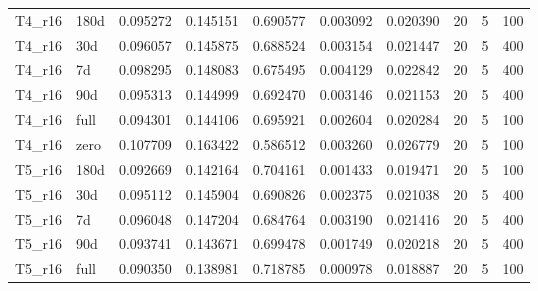 \begin{tabular}{llrrrrrrrr}
T4\_r16 & 180d & 0.095272 & 0.145151 & 0.690577 & 0.003092 & 0.020390 & 20 & 5 & 100 \\
T4\_r16 & 30d & 0.096057 & 0.145875 & 0.688524 & 0.003154 & 0.021447 & 20 & 5 & 400 \\
T4\_r16 & 7d & 0.098295 & 0.148083 & 0.675495 & 0.004129 & 0.022842 & 20 & 5 & 400 \\
T4\_r16 & 90d & 0.095313 & 0.144999 & 0.692470 & 0.003146 & 0.021153 & 20 & 5 & 400 \\
T4\_r16 & full & 0.094301 & 0.144106 & 0.695921 & 0.002604 & 0.020284 & 20 & 5 & 100 \\
T4\_r16 & zero & 0.107709 & 0.163422 & 0.586512 & 0.003260 & 0.026779 & 20 & 5 & 100 \\
T5\_r16 & 180d & 0.092669 & 0.142164 & 0.704161 & 0.001433 & 0.019471 & 20 & 5 & 100 \\
T5\_r16 & 30d & 0.095112 & 0.145904 & 0.690826 & 0.002375 & 0.021038 & 20 & 5 & 400 \\
T5\_r16 & 7d & 0.096048 & 0.147204 & 0.684764 & 0.003190 & 0.021416 & 20 & 5 & 400 \\
T5\_r16 & 90d & 0.093741 & 0.143671 & 0.699478 & 0.001749 & 0.020218 & 20 & 5 & 400 \\
T5\_r16 & full & 0.090350 & 0.138981 & 0.718785 & 0.000978 & 0.018887 & 20 & 5 & 100 \\
\bottomrule
\end{tabular}
